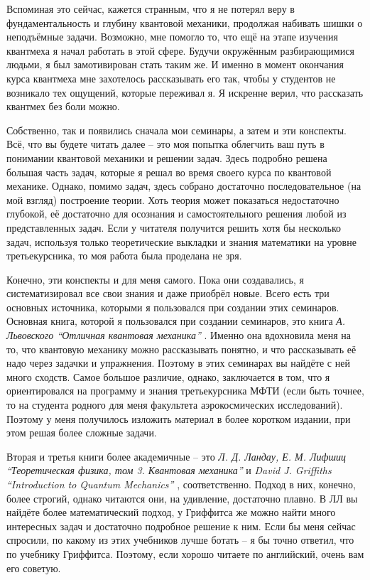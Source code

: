 Вспоминая это сейчас, кажется странным, что я не потерял веру в фундаментальность и глубину квантовой механики, продолжая набивать шишки о неподъёмные задачи. Возможно, мне помогло то, что ещё на этапе изучения квантмеха я начал работать в этой сфере. Будучи окружённым разбирающимися людьми, я был замотивирован стать таким же. И именно в момент окончания курса квантмеха мне захотелось рассказывать его так, чтобы у студентов не возникало тех ощущений, которые переживал я. Я искренне верил, что рассказать квантмех без боли можно.

Собственно, так и появились сначала мои семинары, а затем и эти конспекты. Всё, что вы будете читать далее – это моя попытка облегчить ваш путь в понимании квантовой механики и решении задач. Здесь подробно решена большая часть задач, которые я решал во время своего курса по квантовой механике. Однако, помимо задач, здесь собрано достаточно последовательное (на мой взгляд) построение теории. Хоть теория может показаться недостаточно глубокой, её достаточно для осознания и самостоятельного решения любой из представленных задач. Если у читателя получится решить хотя бы несколько задач, используя только теоретические выкладки и знания математики на уровне третьекурсника, то моя работа была проделана не зря.

Конечно, эти конспекты и для меня самого. Пока они создавались, я систематизировал все свои знания и даже приобрёл новые. Всего есть три основных источника, которыми я пользовался при создании этих семинаров. Основная книга, которой я пользовался при создании семинаров, это книга \textit{А. Львовского ``Отличная квантовая механика''} \cite{ОКМ}. Именно она вдохновила меня на то, что квантовую механику можно рассказывать понятно, и что рассказывать её надо через задачки и упражнения. Поэтому в этих семинарах вы найдёте с ней много сходств. Самое большое различие, однако, заключается в том, что я ориентировался на программу и знания третьекурсника МФТИ (если быть точнее, то на студента родного для меня факультета аэрокосмических исследований). Поэтому у меня получилось изложить материал в более коротком издании, при этом решая более сложные задачи.

Вторая и третья книги более академичные -- это \textit{Л. Д. Ландау, Е. М. Лифшиц ``Теоретическая физика, том 3. Квантовая механика''} \cite{ЛЛ} и \textit{David J. Griffiths ``Introduction to Quantum Mechanics''} \cite{IQM}, соответственно. Подход в них, конечно, более строгий, однако читаются они, на удивление, достаточно плавно. В ЛЛ вы найдёте более математический подход, у Гриффитса же можно найти много интересных задач и достаточно подробное решение к ним. Если бы меня сейчас спросили, по какому из этих учебников лучше ботать -- я бы точно ответил, что по учебнику Гриффитса. Поэтому, если хорошо читаете по английский, очень вам его советую.

